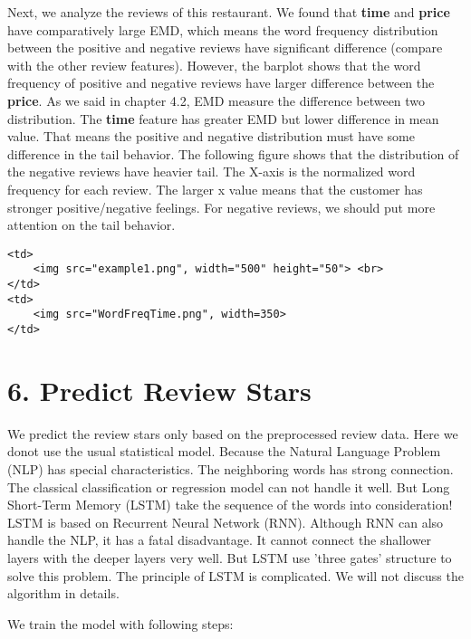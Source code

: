 \documentclass[11pt]{article}
\begin{document}
Next, we analyze the reviews of this restaurant. We found that
\textbf{time} and \textbf{price} have comparatively large EMD, which
means the word frequency distribution between the positive and negative
reviews have significant difference (compare with the other review
features). However, the barplot shows that the word frequency of
positive and negative reviews have larger difference between the
\textbf{price}. As we said in chapter 4.2, EMD measure the difference
between two distribution. The \textbf{time} feature has greater EMD but
lower difference in mean value. That means the positive and negative
distribution must have some difference in the tail behavior. The
following figure shows that the distribution of the negative reviews
have heavier tail. The X-axis is the normalized word frequency for each
review. The larger x value means that the customer has stronger
positive/negative feelings. For negative reviews, we should put more
attention on the tail behavior.

\begin{verbatim}
<td>
    <img src="example1.png", width="500" height="50"> <br>
</td>
<td>
    <img src="WordFreqTime.png", width=350>
</td>
\end{verbatim}

    \section{6. Predict Review Stars}\label{predict-review-stars}

    We predict the review stars only based on the preprocessed review data.
Here we donot use the usual statistical model. Because the Natural
Language Problem (NLP) has special characteristics. The neighboring
words has strong connection. The classical classification or regression
model can not handle it well. But Long Short-Term Memory (LSTM) take the
sequence of the words into consideration! LSTM is based on Recurrent
Neural Network (RNN). Although RNN can also handle the NLP, it has a
fatal disadvantage. It cannot connect the shallower layers with the
deeper layers very well. But LSTM use 'three gates' structure to solve
this problem. The principle of LSTM is complicated. We will not discuss
the algorithm in details.

We train the model with following steps:
\end{document}
